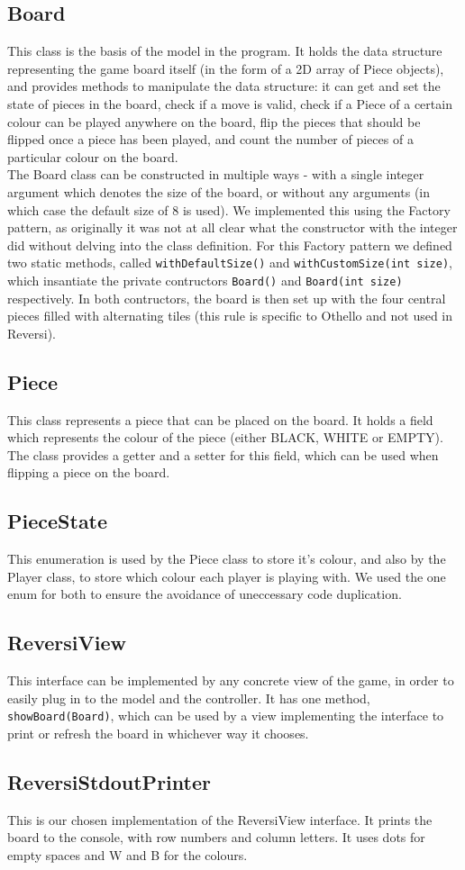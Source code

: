 \documentclass[11pt,a4paper,oneside]{report}
\begin{document}
\subsection*{Board}
This class is the basis of the model in the program. It holds the data structure representing the game board itself (in the form of a 2D array of Piece objects), and provides methods to manipulate the data structure: it can get and set the state of pieces in the board, check if a move is valid, check if a Piece of a certain colour can be played anywhere on the board, flip the pieces that should be flipped once a piece has been played, and count the number of pieces of a particular colour on the board.\\
\indent The Board class can be constructed in multiple ways - with a single integer argument which denotes the size of the board, or without any arguments (in which case the default size of 8 is used). We implemented this using the Factory pattern, as originally it was not at all clear what the constructor with the integer did without delving into the class definition. For this Factory pattern we defined two static methods, called \texttt{withDefaultSize()} and \texttt{withCustomSize(int size)}, which insantiate the private contructors \texttt{Board()} and \texttt{Board(int size)} respectively. In both contructors, the board is then set up with the four central pieces filled with alternating tiles (this rule is specific to Othello and not used in Reversi). 

\subsection*{Piece}
This class represents a piece that can be placed on the board. It holds a field which represents the colour of the piece (either BLACK, WHITE or EMPTY). The class provides a getter and a setter for this field, which can be used when flipping a piece on the board. 

\subsection*{PieceState}
This enumeration is used by the Piece class to store it's colour, and also by the Player class, to store which colour each player is playing with. We used the one enum for both to ensure the avoidance of uneccessary code duplication.

\subsection*{ReversiView}
This interface can be implemented by any concrete view of the game, in order to easily plug in to the model and the controller. It has one method, \texttt{showBoard(Board)}, which can be used by a view implementing the interface to print or refresh the board in whichever way it chooses.

\subsection*{ReversiStdoutPrinter}
This is our chosen implementation of the ReversiView interface. It prints the board to the console, with row numbers and column letters. It uses dots for empty spaces and W and B for the colours.
\end{document}
